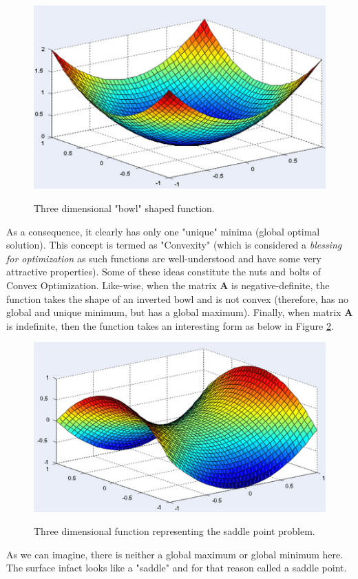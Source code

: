 \documentclass[a4paper]{article}
\begin{document}
\begin{figure}[!htb]\label{fig:BowlFunction}
  \centering
  \includegraphics[width=0.5\columnwidth]{Convex_Function}\\
  \caption{Three dimensional "bowl" shaped function.}\label{fig:BowlFunction}
\end{figure}
\noindent As a consequence, it clearly has only one "unique" minima (global optimal solution). This concept is termed as "Convexity" (which is considered a {\it blessing for optimization} as such functions are well-understood and have some very attractive properties). Some of these ideas constitute the nuts and bolts of Convex Optimization. Like-wise, when the matrix $\mathbf{A}$ is negative-definite, the function takes the shape of an inverted bowl and is not convex (therefore, has no global and unique minimum, but has a global maximum). Finally, when matrix $\mathbf{A}$ is indefinite, then the function takes an interesting form as below in Figure \ref{fig:SaddlePointFunction}.
\begin{figure}[!htb]\label{fig:SaddlePointFunction}
  \centering
  \includegraphics[width=0.5\columnwidth]{SaddlePoint_Function}\\
  \caption{Three dimensional function representing the saddle point problem.}\label{fig:SaddlePointFunction}
\end{figure}
As we can imagine, there is neither a global maximum or global minimum here. The surface infact looks like a "saddle" and for that reason called a saddle point.
\end{document}

